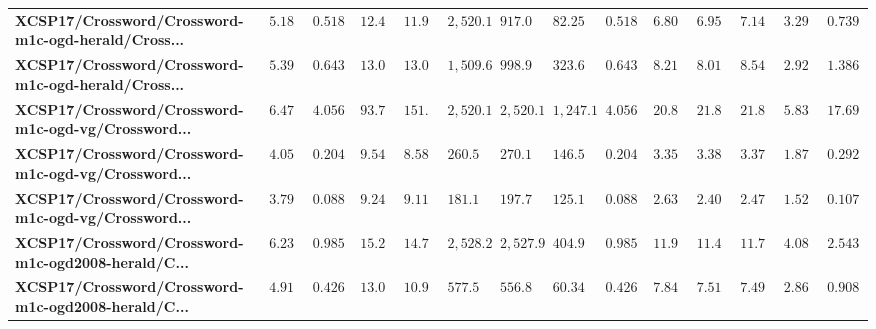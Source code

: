 \begin{tabular}{llllllllllllll}
\textbf{XCSP17/Crossword/Crossword-m1c-ogd-herald/Cross...} &         $5.18244$ &   $0.518539$ &      $12.408$ &       $11.9097$ &                                 $2,520.19$ &                               $917.053$ &           $82.2581$ &  $0.518539$ &               $6.80391$ &                $6.9518$ &               $7.14945$ &               $3.29699$ &  $0.739115$ \\
\textbf{XCSP17/Crossword/Crossword-m1c-ogd-herald/Cross...} &         $5.39783$ &   $0.643414$ &     $13.0435$ &       $13.0156$ &                                  $1,509.6$ &                               $998.986$ &           $323.651$ &  $0.643414$ &               $8.21778$ &               $8.01852$ &               $8.54585$ &               $2.92644$ &    $1.3869$ \\
\textbf{XCSP17/Crossword/Crossword-m1c-ogd-vg/Crossword...} &         $6.47092$ &    $4.05663$ &      $93.779$ &       $151.712$ &                                 $2,520.17$ &                              $2,520.12$ &          $1,247.15$ &   $4.05663$ &               $20.8121$ &               $21.8001$ &                $21.857$ &               $5.83089$ &   $17.6904$ \\
\textbf{XCSP17/Crossword/Crossword-m1c-ogd-vg/Crossword...} &         $4.05744$ &   $0.204409$ &     $9.54457$ &       $8.58872$ &                                  $260.591$ &                               $270.138$ &           $146.508$ &  $0.204409$ &               $3.35596$ &               $3.38285$ &               $3.37457$ &                $1.8794$ &  $0.292243$ \\
\textbf{XCSP17/Crossword/Crossword-m1c-ogd-vg/Crossword...} &         $3.79343$ &   $0.088318$ &     $9.24714$ &       $9.11342$ &                                  $181.108$ &                               $197.764$ &           $125.121$ &  $0.088318$ &               $2.63324$ &               $2.40197$ &               $2.47783$ &               $1.52951$ &  $0.107971$ \\
\textbf{XCSP17/Crossword/Crossword-m1c-ogd2008-herald/C...} &         $6.23734$ &   $0.985276$ &     $15.2238$ &       $14.7065$ &                                 $2,528.25$ &                               $2,527.9$ &           $404.925$ &  $0.985276$ &               $11.9939$ &               $11.4557$ &               $11.7543$ &               $4.08384$ &   $2.54324$ \\
\textbf{XCSP17/Crossword/Crossword-m1c-ogd2008-herald/C...} &         $4.91448$ &   $0.426879$ &     $13.0478$ &       $10.9089$ &                                  $577.503$ &                               $556.865$ &           $60.3405$ &  $0.426879$ &               $7.84374$ &               $7.51214$ &               $7.49885$ &                $2.8604$ &  $0.908489$ \\

\end{tabular}

